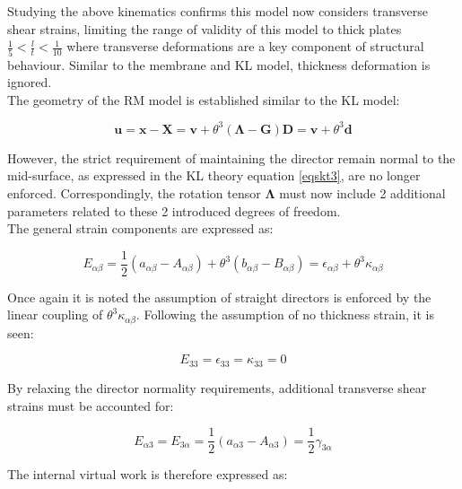Studying the above kinematics confirms this model now considers transverse shear strains, limiting the range of validity of this model to thick plates $\frac{1}{5} < \frac{l}{t} < \frac{1}{10}$ where transverse deformations are a key component of structural behaviour. Similar to the membrane and KL model, thickness deformation is ignored. \\

The geometry of the RM model is established similar to the KL model:

\begin{equation} 
\mathbf{u} = \mathbf{x} - \mathbf{X}
=
\mathbf{v} + \theta^3 (\boldsymbol{\Lambda} - \mathbf{G}) \mathbf{D}
=
\mathbf{v} + \theta^3 \mathbf{d}
\label{eqsrm1}
\end{equation}

However, the strict requirement of maintaining the director remain normal to the mid-surface, as expressed in the KL theory equation \eqref{eqskt3}, are no longer enforced. Correspondingly, the rotation tensor $\boldsymbol{\Lambda}$ must now include 2 additional parameters related to these 2 introduced degrees of freedom. \\

The general strain components are expressed as:

\begin{equation} 
E_{\alpha \beta}
= \frac{1}{2}
(a_{\alpha\beta} - A_{\alpha\beta})
+
\theta^3 (b_{\alpha\beta} - B_{\alpha\beta})
=
\epsilon_{\alpha \beta} + \theta^3 \kappa_{\alpha \beta}
\label{eqsrm2}
\end{equation}

Once again it is noted the assumption of straight directors is enforced by the linear coupling of $\theta^3 \kappa_{\alpha \beta}$. Following the assumption of no thickness strain, it is seen:

\begin{equation} 
E_{33} = \epsilon_{33} = \kappa_{33} = 0
\label{eqsrm21}
\end{equation}

By relaxing the director normality requirements, additional transverse shear strains must be accounted for:

\begin{equation} 
E_{\alpha 3} = E_{3 \alpha}
= \frac{1}{2}
(a_{\alpha 3} - A_{\alpha 3})
=
\frac{1}{2} \gamma_{3\alpha}
\label{eqsrm3}
\end{equation}

The internal virtual work is therefore expressed as:

